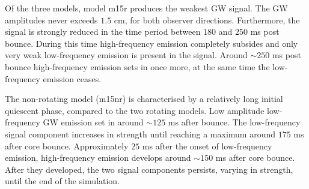 Of the three models, model m15r produces the weakest GW signal. The GW amplitudes
never exceeds $1.5$ cm, for both observer directions. Furthermore, the signal is strongly reduced in the
time period between $180$ and $250$ ms post bounce. During this time high-frequency emission
completely subsides and only very weak low-frequency emission is present in the signal.
Around $\sim 250$ ms post bounce high-frequency emission sets in once more, 
at the same time the low-frequency emission ceases. 

The non-rotating model (m15nr) is characterised by a relatively long initial quiescent phase, compared to the two
rotating models. Low amplitude low-frequency GW emission set in around $\sim 125$ ms after bounce. The low-frequency
signal component increases in strength until reaching a maximum around $175$ ms after core bounce.
Approximately $25$ ms after the onset of low-frequency emission, high-frequency emission develops around
$\sim 150$ ms after core bounce. After they developed, the two signal components persists, varying in
strength, until the end of the simulation.

